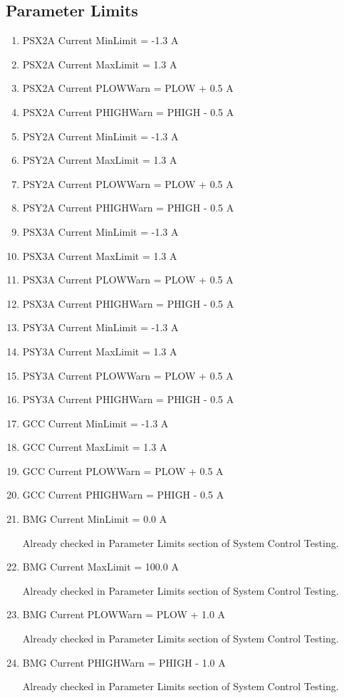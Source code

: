\documentclass[11pt]{book}		%
\begin{document}
\subsection{Parameter Limits}

\begin{enumerate}
 \item PSX2A Current MinLimit = -1.3 A
 \item PSX2A Current MaxLimit = 1.3 A
 \item PSX2A Current PLOWWarn = PLOW + 0.5 A
 \item PSX2A Current PHIGHWarn = PHIGH - 0.5 A
 \item PSY2A Current MinLimit = -1.3 A
 \item PSY2A Current MaxLimit = 1.3 A
 \item PSY2A Current PLOWWarn = PLOW + 0.5 A
 \item PSY2A Current PHIGHWarn = PHIGH - 0.5 A
 \item PSX3A Current MinLimit = -1.3 A
 \item PSX3A Current MaxLimit = 1.3 A
 \item PSX3A Current PLOWWarn = PLOW + 0.5 A
 \item PSX3A Current PHIGHWarn = PHIGH - 0.5 A
 \item PSY3A Current MinLimit = -1.3 A
 \item PSY3A Current MaxLimit = 1.3 A
 \item PSY3A Current PLOWWarn = PLOW + 0.5 A
 \item PSY3A Current PHIGHWarn = PHIGH - 0.5 A
 \item GCC Current MinLimit = -1.3 A
 \item GCC Current MaxLimit = 1.3 A
 \item GCC Current PLOWWarn = PLOW + 0.5 A
 \item GCC Current PHIGHWarn = PHIGH - 0.5 A
 \item BMG Current MinLimit = 0.0 A

\color{red}
Already checked in Parameter Limits section of System Control Testing.
\color{black}

 \item BMG Current MaxLimit = 100.0 A

\color{red}
Already checked in Parameter Limits section of System Control Testing.
\color{black}

 \item BMG Current PLOWWarn = PLOW + 1.0 A

\color{red}
Already checked in Parameter Limits section of System Control Testing.
\color{black}

 \item BMG Current PHIGHWarn = PHIGH - 1.0 A

\color{red}
Already checked in Parameter Limits section of System Control Testing.
\color{black}

\end{enumerate}
\end{document}
